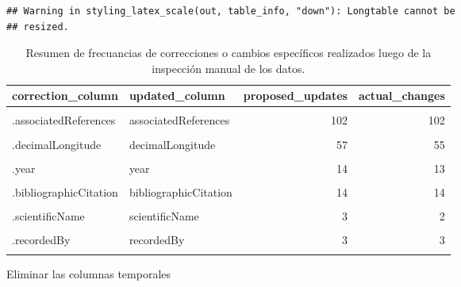 \documentclass[sn-apa,pdflatex]{sn-jnl}
\begin{document}
\begin{verbatim}
## Warning in styling_latex_scale(out, table_info, "down"): Longtable cannot be
## resized.
\end{verbatim}

\begingroup\fontsize{10}{12}\selectfont

\begin{longtable}[t]{llrr}
\caption{\label{tab:unnamed-chunk-199}Resumen de frecuancias de correcciones o cambios  específicos realizados luego de la inspección manual de los datos.}\\
\toprule
\textbf{correction\_column} & \textbf{updated\_column} & \textbf{proposed\_updates} & \textbf{actual\_changes}\\
\midrule
\cellcolor{gray!10}{.references} & \cellcolor{gray!10}{references} & \cellcolor{gray!10}{4} & \cellcolor{gray!10}{4}\\
.associatedReferences & associatedReferences & 102 & 102\\
\cellcolor{gray!10}{.decimalLatitude} & \cellcolor{gray!10}{decimalLatitude} & \cellcolor{gray!10}{57} & \cellcolor{gray!10}{54}\\
.decimalLongitude & decimalLongitude & 57 & 55\\
\cellcolor{gray!10}{.locality} & \cellcolor{gray!10}{locality} & \cellcolor{gray!10}{24} & \cellcolor{gray!10}{24}\\
\addlinespace
.year & year & 14 & 13\\
\cellcolor{gray!10}{.eventDate} & \cellcolor{gray!10}{eventDate} & \cellcolor{gray!10}{6} & \cellcolor{gray!10}{6}\\
.bibliographicCitation & bibliographicCitation & 14 & 14\\
\cellcolor{gray!10}{.canonicalName} & \cellcolor{gray!10}{canonicalName} & \cellcolor{gray!10}{6} & \cellcolor{gray!10}{2}\\
.scientificName & scientificName & 3 & 2\\
\addlinespace
\cellcolor{gray!10}{.catalogNumber} & \cellcolor{gray!10}{catalogNumber} & \cellcolor{gray!10}{2} & \cellcolor{gray!10}{2}\\
.recordedBy & recordedBy & 3 & 3\\
\cellcolor{gray!10}{.occurrenceID} & \cellcolor{gray!10}{occurrenceID} & \cellcolor{gray!10}{1} & \cellcolor{gray!10}{1}\\
\bottomrule
\end{longtable}
\endgroup{}

Eliminar las columnas temporales
\end{document}
